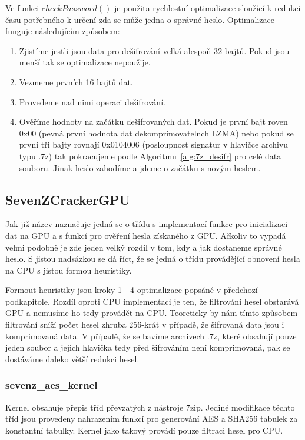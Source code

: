  Ve funkci $checkPassword()$ je použita rychlostní optimalizace sloužící k redukci času
potřebného k určení zda se může jedna o správné heslo. Optimalizace funguje následujícím způsobem:
\begin{enumerate}
    \item Zjistíme jestli jsou data pro dešifrování velká alespoň 32 bajtů. Pokud jsou menší tak
	se optimalizace nepoužije.
    \item Vezmeme prvních 16 bajtů dat.
    \item Provedeme nad nimi operaci dešifrování.
    \item Ověříme hodnoty na začátku dešifrovaných dat. Pokud je první bajt roven 0x00
	(pevná první hodnota dat dekomprimovatelnch LZMA) nebo pokud se první tři bajty rovnají
	0x0104006 (posloupnost signatur v hlavičce archivu typu .7z) tak pokracujeme podle
	Algoritmu~\ref{alg:7z_desifr} pro celé data souboru. Jinak heslo zahodíme a jdeme o
	začátku s novým heslem.
\end{enumerate}
\subsection{SevenZCrackerGPU}
Jak již název naznačuje jedná se o třídu s implementací funkce pro inicializaci dat na GPU a s
funkcí pro ověření hesla získaného z GPU. Ačkoliv to vypadá velmi podobně je zde jeden velký
rozdíl v tom, kdy a jak dostaneme správné heslo. S jistou nadsázkou se dá říct, že se jedná o
třídu provádějící obnovení hesla na CPU s jistou formou heuristiky. 

Formout heuristiky jsou kroky 1 - 4 optimalizace popsáné v předchozí podkapitole. Rozdíl oproti
CPU implementaci je ten, že filtrování hesel obstarává GPU a nemusíme ho tedy provádět na CPU.
Teoreticky by nám tímto způsobem filtrování sníží počet hesel zhruba 256-krát v případě, že
šifrovaná data jsou i komprimovaná data. V případě, že se bavíme archivech .7z, které obsahují
pouze jeden soubor a jejich hlavička tedy před šifrováním není komprimovaná, pak se dostáváme
daleko větší redukci hesel.

\subsubsection{sevenz\_aes\_kernel}
Kernel obsahuje přepis tříd převzatých z nástroje 7zip. Jediné modifikace těchto tříd jsou
provedeny nahrazením funkcí pro generování AES a SHA256 tabulek za konstantní tabulky. Kernel jako
takový provádí pouze filtraci hesel pro CPU. 

